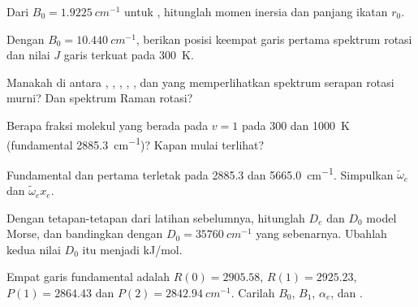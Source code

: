 \begin{exercise}[$\star$]\label{exo:b3:rovibrational-spectroscopy:1}
Dari $B_0 = \qty{1.9225}{cm^{-1}}$ untuk , hitunglah momen
inersia dan panjang ikatan $r_0$.
\end{exercise}

\begin{exercise}[$\star$]\label{exo:b3:rovibrational-spectroscopy:2}
Dengan $B_0 = \qty{10.440}{cm^{-1}}$, berikan posisi keempat garis pertama
spektrum rotasi  dan nilai $J$ garis terkuat pada
\qty{300}{K}.
\end{exercise}

\begin{exercise}[$\star$]\label{exo:b3:rovibrational-spectroscopy:3}
Manakah di antara , , , , ,  dan
 yang memperlihatkan spektrum serapan rotasi murni? Dan spektrum
Raman rotasi?
\end{exercise}

\begin{exercise}[$\star$]\label{exo:b3:rovibrational-spectroscopy:4}
Berapa fraksi molekul  yang berada pada $v = 1$ pada 300 dan
\qty{1000}{K} (fundamental \qty{2885.3}{cm^{-1}})? Kapan  mulai
terlihat?
\end{exercise}

\begin{exercise}[$\star\star$]\label{exo:b3:rovibrational-spectroscopy:5}
Fundamental dan  pertama  terletak pada 2885.3 dan
\qty{5665.0}{cm^{-1}}. Simpulkan $\tilde\omega_e$ dan $\tilde\omega_ex_e$.
\end{exercise}

\begin{exercise}[$\star\star$]\label{exo:b3:rovibrational-spectroscopy:6}
Dengan tetapan-tetapan dari latihan sebelumnya, hitunglah $D_e$ dan $D_0$
model Morse, dan bandingkan dengan $D_0 = \qty{35760}{cm^{-1}}$ yang
sebenarnya.
Ubahlah kedua nilai $D_0$ itu menjadi \unit{kJ/mol}.
\end{exercise}

\begin{exercise}[$\star\star$]\label{exo:b3:rovibrational-spectroscopy:7}
Empat garis fundamental  adalah $R(0) = 2905.58$, $R(1) = 2925.23$,
$P(1) = 2864.43$ dan $P(2) = \qty{2842.94}{cm^{-1}}$. Carilah $B_0$, $B_1$,
$\alpha_e$, dan .
\end{exercise}

